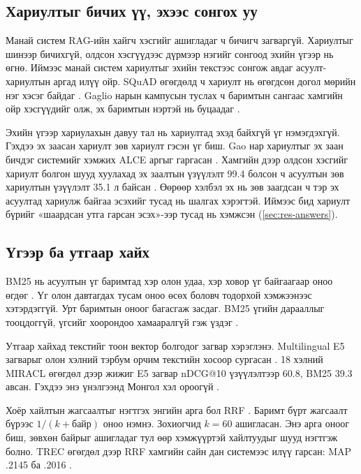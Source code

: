 \subsection{Хариултыг бичих үү, эхээс сонгох уу}
\label{sec:lit-selective}

Манай систем RAG-ийн хайгч хэсгийг ашигладаг ч бичигч загваргүй. Хариултыг шинээр бичихгүй, олдсон хэсгүүдээс дүрмээр нэгийг сонгоод эхийн үгээр нь өгнө. Иймээс манай систем хариултыг эхийн текстээс сонгож авдаг асуулт-хариултын аргад илүү ойр. SQuAD өгөгдөлд ч хариулт нь өгөгдсөн догол мөрийн нэг хэсэг байдаг \cite{rajpurkar2018squad2}. Gaglio нарын кампусын туслах ч баримтын сангаас хамгийн ойр хэсгүүдийг олж, эх баримтын нэртэй нь буцаадаг \cite{gaglio2019campus}.

Эхийн үгээр хариулахын давуу тал нь хариултад эхэд байхгүй үг нэмэгдэхгүй. Гэхдээ эх заасан хариулт зөв хариулт гэсэн үг биш. Gao нар хариултыг эх заан бичдэг системийг хэмжих ALCE аргыг гаргасан \cite{gao2023alce}. Хамгийн дээр олдсон хэсгийг хариулт болгон шууд хуулахад эх заалтын үзүүлэлт 99.4 болсон ч асуултын зөв хариултын үзүүлэлт 35.1 л байсан \cite{gao2023alce}. Өөрөөр хэлбэл эх нь зөв заагдсан ч тэр эх асуултад хариулж байгаа эсэхийг тусад нь шалгах хэрэгтэй. Иймээс бид хариулт бүрийг «шаардсан утга гарсан эсэх»-ээр тусад нь хэмжсэн (\ref{sec:res-answers}).

\subsection{Үгээр ба утгаар хайх}

BM25 нь асуултын үг баримтад хэр олон удаа, хэр ховор үг байгаагаар оноо өгдөг \cite{robertson2009bm25}. Үг олон давтагдах тусам оноо өсөх боловч тодорхой хэмжээнээс хэтэрдэггүй. Урт баримтын оноог багасгаж засдаг. BM25 үгийн дарааллыг тооцдоггүй, үгсийг хоорондоо хамааралгүй гэж үздэг \cite{robertson2009bm25}.

Утгаар хайхад текстийг тоон вектор болгодог загвар хэрэглэнэ. Multilingual E5 загварыг олон хэлний тэрбум орчим текстийн хосоор сургасан \cite{wang2024me5}. 18 хэлний MIRACL өгөгдөл дээр жижиг E5 загвар nDCG@10 үзүүлэлтээр 60.8, BM25 39.3 авсан. Гэхдээ энэ үнэлгээнд Монгол хэл ороогүй \cite{wang2024me5}.

Хоёр хайлтын жагсаалтыг нэгтгэх энгийн арга бол \ac{RRF} \cite{cormack2009rrf}. Баримт бүрт жагсаалт бүрээс $1/(k + \text{байр})$ оноо нэмнэ. Зохиогчид $k=60$ ашигласан. Энэ арга оноог биш, зөвхөн байрыг ашигладаг тул өөр хэмжүүртэй хайлтуудыг шууд нэгтгэж болно. TREC өгөгдөл дээр RRF хамгийн сайн дан системээс илүү гарсан: MAP .2145 ба .2016 \cite{cormack2009rrf}.

